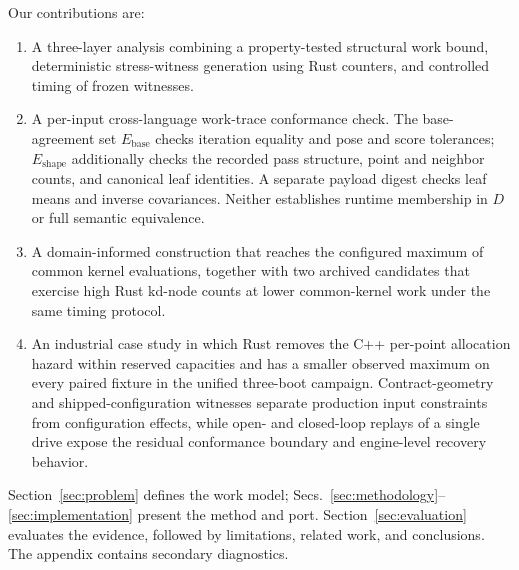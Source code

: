 Our contributions are:
\begin{enumerate}
  \item A three-layer analysis combining a property-tested structural work bound,
    deterministic stress-witness generation using Rust counters, and controlled timing of
    frozen witnesses.
  \item A per-input cross-language work-trace conformance check. The base-agreement set
    $E_{\mathrm{base}}$ checks iteration equality and pose and score tolerances;
    $E_{\mathrm{shape}}$ additionally checks the recorded
    pass structure, point and neighbor counts, and canonical leaf identities. A separate
    payload digest checks leaf means and inverse covariances. Neither establishes runtime
    membership in $D$ or full semantic equivalence.
  \item A domain-informed construction that reaches the configured maximum of
    \runtimeKernelEvalMax{} common kernel evaluations, together with two archived candidates that
    exercise high Rust kd-node counts at lower common-kernel work under the same timing
    protocol.
  \item An industrial case study in which Rust removes the C++ per-point allocation hazard
    within reserved capacities and has a smaller observed maximum on every paired fixture in
    the unified three-boot campaign. Contract-geometry and
    shipped-configuration witnesses separate production input constraints from
    configuration effects, while open- and closed-loop replays of a single drive expose
    the residual conformance boundary and engine-level recovery behavior.
\end{enumerate}

Section~\ref{sec:problem} defines the work model;
Secs.~\ref{sec:methodology}--\ref{sec:implementation} present the method and port.
Section~\ref{sec:evaluation} evaluates the evidence, followed by limitations, related work,
and conclusions. The appendix contains secondary diagnostics.
